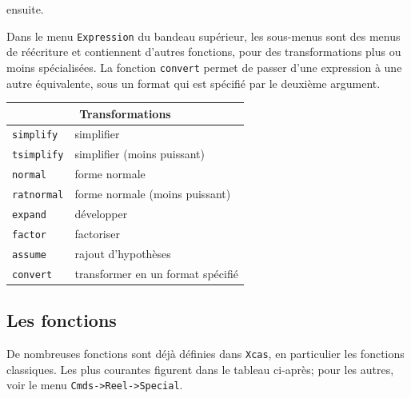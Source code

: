 \documentclass{article}
\begin{document}
\begin{giacjshere}
\begin{itemize}
ensuite.
\end{itemize}
Dans le menu \verb|Expression| du bandeau sup\'erieur, les sous-menus sont
des menus de r\'e\'ecriture et contiennent d'autres fonctions, pour des 
transformations plus ou moins sp\'ecialis\'ees.  
La fonction \verb|convert| permet de passer d'une expression \`a une
autre \'equivalente, sous un format qui est sp\'ecifi\'e par le
deuxi\`eme argument. 

\begin{center}
\begin{tabular}{|ll|}
\hline
\multicolumn{2}{|c|}{\bf Transformations}\\
\hline\hline
\verb|simplify|& simplifier\\
\verb|tsimplify|& simplifier (moins puissant)\\
\verb|normal|& forme normale\\
\verb|ratnormal|& forme normale (moins puissant)\\
\verb|expand|& d\'evelopper\\
\verb|factor|& factoriser\\
\verb|assume|& rajout d'hypoth\`eses\\
\verb|convert|& transformer en un format sp\'ecifi\'e\\
\hline
\end{tabular}
\end{center}
%
\subsection{Les fonctions}
%
De nombreuses fonctions sont d\'ej\`a d\'efinies dans {\tt Xcas}, en
particulier les fonctions classiques. Les plus courantes figurent dans
le tableau ci-apr\`es; pour les autres, voir le menu \verb|Cmds->Reel->Special|.\\


\end{giacjshere}
\end{document}

